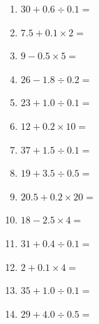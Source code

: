 \documentclass[12pt]{article}
\begin{document}
\begin{enumerate}
\item \large $ 30 + 0.6 \div 0.1 = $ \vspace{1.6cm}
\item \large $ 7.5 + 0.1 \times 2 = $ \vspace{1.6cm}
\item \large $ 9 - 0.5 \times 5 = $ \vspace{1.6cm}
\item \large $ 26 - 1.8 \div 0.2 = $ \vspace{1.6cm}
\newpage
\item \large $ 23 + 1.0 \div 0.1 = $ \vspace{1.6cm}
\item \large $ 12 + 0.2 \times 10 = $ \vspace{1.6cm}
\item \large $ 37 + 1.5 \div 0.1 = $ \vspace{1.6cm}
\item \large $ 19 + 3.5 \div 0.5 = $ \vspace{1.6cm}
\item \large $ 20.5 + 0.2 \times 20 = $ \vspace{1.6cm}
\item \large $ 18 - 2.5 \times 4 = $ \vspace{1.6cm}
\item \large $ 31 + 0.4 \div 0.1 = $ \vspace{1.6cm}
\item \large $ 2 + 0.1 \times 4 = $ \vspace{1.6cm}
\item \large $ 35 + 1.0 \div 0.1 = $ \vspace{1.6cm}
\item \large $ 29 + 4.0 \div 0.5 = $ \vspace{1.6cm}
\end{enumerate}
\newpage
\end{document}
